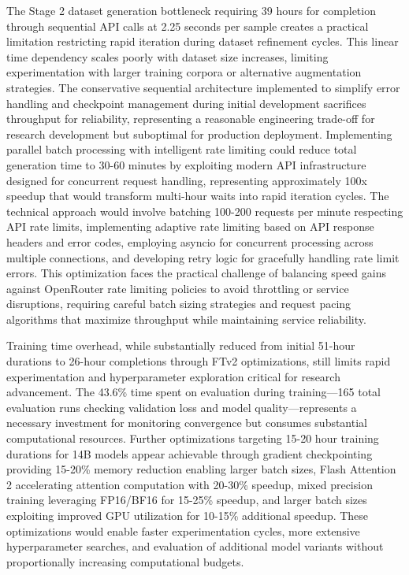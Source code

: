 The Stage 2 dataset generation bottleneck requiring 39 hours for completion through sequential API calls at 2.25 seconds per sample creates a practical limitation restricting rapid iteration during dataset refinement cycles. This linear time dependency scales poorly with dataset size increases, limiting experimentation with larger training corpora or alternative augmentation strategies. The conservative sequential architecture implemented to simplify error handling and checkpoint management during initial development sacrifices throughput for reliability, representing a reasonable engineering trade-off for research development but suboptimal for production deployment. Implementing parallel batch processing with intelligent rate limiting could reduce total generation time to 30-60 minutes by exploiting modern API infrastructure designed for concurrent request handling, representing approximately 100x speedup that would transform multi-hour waits into rapid iteration cycles. The technical approach would involve batching 100-200 requests per minute respecting API rate limits, implementing adaptive rate limiting based on API response headers and error codes, employing asyncio for concurrent processing across multiple connections, and developing retry logic for gracefully handling rate limit errors. This optimization faces the practical challenge of balancing speed gains against OpenRouter rate limiting policies to avoid throttling or service disruptions, requiring careful batch sizing strategies and request pacing algorithms that maximize throughput while maintaining service reliability.

Training time overhead, while substantially reduced from initial 51-hour durations to 26-hour completions through FTv2 optimizations, still limits rapid experimentation and hyperparameter exploration critical for research advancement. The 43.6\% time spent on evaluation during training---165 total evaluation runs checking validation loss and model quality---represents a necessary investment for monitoring convergence but consumes substantial computational resources. Further optimizations targeting 15-20 hour training durations for 14B models appear achievable through gradient checkpointing providing 15-20\% memory reduction enabling larger batch sizes, Flash Attention 2 accelerating attention computation with 20-30\% speedup, mixed precision training leveraging FP16/BF16 for 15-25\% speedup, and larger batch sizes exploiting improved GPU utilization for 10-15\% additional speedup. These optimizations would enable faster experimentation cycles, more extensive hyperparameter searches, and evaluation of additional model variants without proportionally increasing computational budgets.


